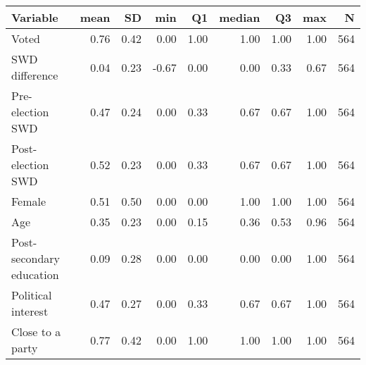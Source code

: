 
\begin{tabular}{l|r|r|r|r|r|r|r|r}
\hline
Variable & mean & SD & min & Q1 & median & Q3 & max & N\\
\hline
Voted & 0.76 & 0.42 & 0.00 & 1.00 & 1.00 & 1.00 & 1.00 & 564\\
\hline
SWD difference & 0.04 & 0.23 & -0.67 & 0.00 & 0.00 & 0.33 & 0.67 & 564\\
\hline
Pre-election SWD & 0.47 & 0.24 & 0.00 & 0.33 & 0.67 & 0.67 & 1.00 & 564\\
\hline
Post-election SWD & 0.52 & 0.23 & 0.00 & 0.33 & 0.67 & 0.67 & 1.00 & 564\\
\hline
Female & 0.51 & 0.50 & 0.00 & 0.00 & 1.00 & 1.00 & 1.00 & 564\\
\hline
Age & 0.35 & 0.23 & 0.00 & 0.15 & 0.36 & 0.53 & 0.96 & 564\\
\hline
Post-secondary education & 0.09 & 0.28 & 0.00 & 0.00 & 0.00 & 0.00 & 1.00 & 564\\
\hline
Political interest & 0.47 & 0.27 & 0.00 & 0.33 & 0.67 & 0.67 & 1.00 & 564\\
\hline
Close to a party & 0.77 & 0.42 & 0.00 & 1.00 & 1.00 & 1.00 & 1.00 & 564\\
\hline
\end{tabular}
